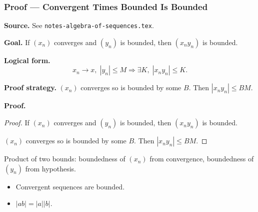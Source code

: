 
\clearpage
{}
\hypertarget{proof-RA-ABB-C-conv-times-bdd}{}

\subsubsection[Convergent Times Bounded Is Bounded]{Proof --- Convergent Times Bounded Is Bounded}

\bigskip

\noindent
\textbf{Source.}
See \texttt{notes-algebra-of-sequences.tex}.

\vspace{0.75em}

\noindent
\textbf{Goal.}
If $(x_n)$ converges and $(y_n)$ is bounded, then $(x_n y_n)$ is bounded.

\vspace{0.75em}

\noindent
\textbf{Logical form.}
\[
  x_n \to x,\; |y_n| \le M \Rightarrow \exists K,\; |x_n y_n| \le K.
\]

\vspace{0.75em}

\noindent
\textbf{Proof strategy.}
$(x_n)$ converges so is bounded by some $B$. Then $|x_n y_n| \le BM$.

\vspace{0.75em}

\noindent
\textbf{Proof.}
\begin{proof}
\Claim If $(x_n)$ converges and $(y_n)$ is bounded, then $(x_n y_n)$ is bounded.

\Given 

\Goal 

\Strategy $(x_n)$ converges so is bounded by some $B$. Then $|x_n y_n| \le BM$.

\medskip


\end{proof}

\begin{remark*}
Product of two bounds: boundedness of $(x_n)$ from convergence, boundedness of $(y_n)$ from hypothesis.
\end{remark*}

\begin{remark*}[Dependencies]
\begin{itemize}
  \item Convergent sequences are bounded.
  \item $|ab| = |a||b|$.
\end{itemize}
\end{remark*}
